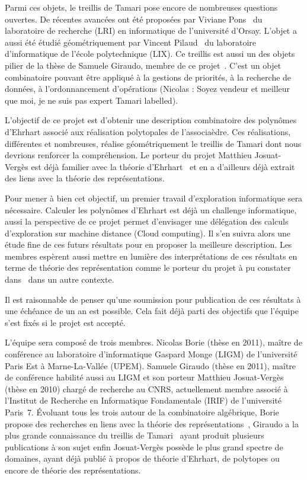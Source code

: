 \documentclass[a4paper, 10pt]{article}
\numberwithin{equation}{subsection}
\begin{document}
Parmi ces objets, le treillis de Tamari pose encore de nombreuses
questions ouvertes. De récentes avancées ont été proposées par Viviane
Pons~\cite{MR3345297} du laboratoire de recherche (LRI) en
informatique de l'université d'Orsay. L'objet a aussi été étudié
géométriquement par Vincent Pilaud~\cite{MR3327085} du laboratoire
d'informatique de l'école polytechnique (LIX). Ce treillis est aussi
un des objets pilier de la thèse de Samuele Giraudo, membre de ce
projet~\cite{MR2887627}. C'est un objet combinatoire pouvant être
appliqué à la gestions de priorités, à la recherche de données, à
l'ordonnancement d'opérations (Nicolas : Soyez vendeur et meilleur que
moi, je ne suis pas expert Tamari labelled).



L'objectif de ce projet est d'obtenir une description combinatoire des
polynômes d'Ehrhart associé aux réalisation polytopales de
l'associaèdre. Ces réalisations, différentes et nombreuses, réalise
géométriquement le treillis de Tamari dont nous devrions renforcer la
compréhension. Le porteur du projet Matthieu Josuat-Vergès est déjà
familier avec la théorie d'Ehrhart~\cite{MR3484760} et en a d'ailleurs
déjà extrait des liens avec la théorie des représentations.



Pour mener à bien cet objectif, un premier travail d'exploration
informatique sera nécessaire. Calculer les polynômes d'Ehrhart est
déjà un challenge informatique, aussi la perspective de ce projet
permet d'envisager une délégation des calculs d'exploration sur
machine distance (Cloud computing). Il s'en suivra alors une étude
fine de ces futurs résultats pour en proposer la meilleure
description. Les membres espèrent aussi mettre en lumière des
interprétations de ces résultats en terme de théorie des
représentation comme le porteur du projet à pu constater
dans~\cite{MR3484760} dans un autre contexte.



Il est raisonnable de penser qu'une soumission pour publication de ces
résultats à une échéance de un an est possible. Cela fait déjà parti
des objectifs que l'équipe s'est fixés si le projet est accepté.



L'équipe sera composé de trois membres. Nicolas Borie (thèse en 2011),
maître de conférence au laboratoire d'informatique Gaspard Monge
(LIGM) de l'université Paris Est à Marne-La-Vallée (UPEM). Samuele
Giraudo (thèse en 2011), maître de conférence habilité aussi au LIGM
et son porteur Matthieu Josuat-Vergès (thèse en 2010) chargé de    %
recherche au CNRS, actuellement membre associé à l'Institut de
Recherche en Informatique Fondamentale (IRIF) de l'université Paris~7.
Évoluant tous les trois autour de la combinatoire algébrique, Borie  %
propose des recherches en liens avec la théorie des
représentations~\cite{MR3448031}, Giraudo a la plus grande
connaissance du treillis de Tamari~\cite{MR2887627} ayant produit
plusieurs publications à son sujet enfin Josuat-Vergès possède le plus
grand spectre de domaines, ayant déjà publié à propos de théorie
d'Ehrhart, de polytopes ou encore de théorie des représentations.
\end{document}
